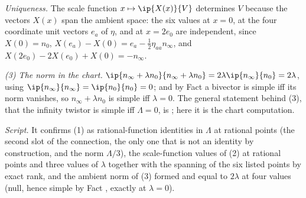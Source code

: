 \emph{Uniqueness.} The scale function $x \mapsto \ip{X(x)}{V}$ determines $V$ because the vectors $X(x)$ span the ambient space: the six values at $x = 0$, at the four coordinate unit vectors $e_{a}$ of $\eta$, and at $x = 2e_{0}$ are independent, since $X(0) = n_{0}$, $X(e_{a}) - X(0) = e_{a} - \tfrac12\eta_{aa}n_{\infty}$, and $X(2e_{0}) - 2X(e_{0}) + X(0) = -n_{\infty}$.

\emph{(3) The norm in the chart.} $\ip{n_{\infty} + \lambda n_{0}}{n_{\infty} + \lambda n_{0}} = 2\lambda\ip{n_{\infty}}{n_{0}} = 2\lambda$, using $\ip{n_{\infty}}{n_{\infty}} = \ip{n_{0}}{n_{0}} = 0$; and by Fact  a bivector is simple iff its norm vanishes, so $n_{\infty} + \lambda n_{0}$ is simple iff $\lambda = 0$. The general statement behind (3), that the infinity twistor is simple iff $\Lambda = 0$, is \cite[Cor.~4.8]{ButlerT9}; here it is the chart computation.

\emph{Script.} It confirms (1) as rational-function identities in $\Lambda$ at rational points (the second slot of the connection, the only one that is not an identity by construction, and the norm $\Lambda/3$), the scale-function values of (2) at rational points and three values of $\lambda$ together with the spanning of the six listed points by exact rank, and the ambient norm of (3) formed and equal to $2\lambda$ at four values (null, hence simple by Fact , exactly at $\lambda = 0$).
